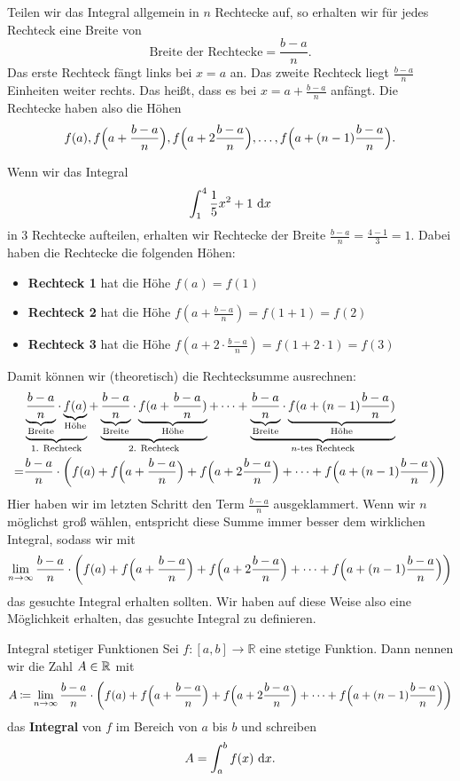 \documentclass[../../main.tex]{subfiles}
\begin{document}
Teilen wir das Integral allgemein in $n$ Rechtecke auf, so erhalten wir für jedes Rechteck eine Breite von
\[\text{Breite der Rechtecke}=\frac{b-a}{n}.\]
Das erste Rechteck fängt links bei $x=a$ an. Das zweite Rechteck liegt $\frac{b-a}{n}$ Einheiten weiter rechts. Das
heißt, dass es bei $x=a+\frac{b-a}{n}$ anfängt. Die Rechtecke haben also die Höhen
\[f(a), f\Bigl(a+\frac{b-a}{n}\Bigr), f\Bigl(a+2\frac{b-a}{n}\Bigr),\dots,f\Bigl(a+(n-1)\frac{b-a}{n}\Bigr).\]
\begin{example}{}
    Wenn wir das Integral
    \[\int_1^4\frac{1}{5}x^2+1\mathop{}\mathrm{d} x\]
    in 3 Rechtecke aufteilen, erhalten wir Rechtecke der Breite $\frac{b-a}{n}=\frac{4-1}{3}=1$. Dabei haben die
    Rechtecke die folgenden Höhen:
    \begin{itemize}
        \item \textbf{Rechteck 1} hat die Höhe $f(a)=f(1)$
        \item \textbf{Rechteck 2} hat die Höhe $f(a+\frac{b-a}{n})=f(1+1)=f(2)$
        \item \textbf{Rechteck 3} hat die Höhe $f(a+2\cdot\frac{b-a}{n})=f(1+2\cdot 1)=f(3)$
    \end{itemize}
\end{example}

Damit können wir (theoretisch) die Rechtecksumme ausrechnen:
\begin{align*}
    &\underbrace{\underbrace{\frac{b-a}{n}}_{\text{Breite}}\cdot \underbrace{f(a)}_{\text{Höhe}}}_{\text{1. Rechteck}}+\underbrace{\underbrace{\frac{b-a}{n}}_{\text{Breite}}\cdot \underbrace{f(a+\frac{b-a}{n})}_{\text{Höhe}}}_{\text{2. Rechteck}}+\dots+\underbrace{\underbrace{\frac{b-a}{n}}_{\text{Breite}}\cdot \underbrace{f(a+(n-1)\frac{b-a}{n})}_{\text{Höhe}}}_{n\text{-tes Rechteck}}\\
    =&\frac{b-a}{n}\cdot \biggl(f(a)+f\Bigl(a+\frac{b-a}{n}\Bigr)+f\Bigl(a+2\frac{b-a}{n}\Bigr)+\dots+f\Bigl(a+(n-1)\frac{b-a}{n}\Bigr)\biggr)
\end{align*}
Hier haben wir im letzten Schritt den Term $\frac{b-a}{n}$ ausgeklammert. Wenn wir $n$ möglichst groß wählen, entspricht diese Summe immer 
besser dem wirklichen Integral, sodass wir mit
\[\lim_{n\rightarrow\infty}\frac{b-a}{n}\cdot \biggl(f(a)+f\Bigl(a+\frac{b-a}{n}\Bigr)+f\Bigl(a+2\frac{b-a}{n}\Bigr)+\dots+f\Bigl(a+(n-1)\frac{b-a}{n}\Bigr)\biggr)\]
das gesuchte Integral erhalten sollten. Wir haben auf diese Weise also eine Möglichkeit erhalten, das gesuchte Integral
zu definieren.

\begin{definition}{Integral stetiger Funktionen}
    Sei $f:[a,b]\rightarrow\mathbb{R}$ eine stetige Funktion. Dann nennen wir die Zahl $A\in\mathbb{R}$ mit
    \[A\mathbin{\coloneqq} \lim_{n\rightarrow\infty}\frac{b-a}{n}\cdot \biggl(f(a)+f\Bigl(a+\frac{b-a}{n}\Bigr)+f\Bigl(a+2\frac{b-a}{n}\Bigr)+\dots+f\Bigl(a+(n-1)\frac{b-a}{n}\Bigr)\biggr)\]
    das \textbf{Integral} von $f$ im Bereich von $a$ bis $b$ und schreiben
    \[A=\int_a^bf(x)\mathop{}\mathrm{d} x.\]
\end{definition}
\end{document}

